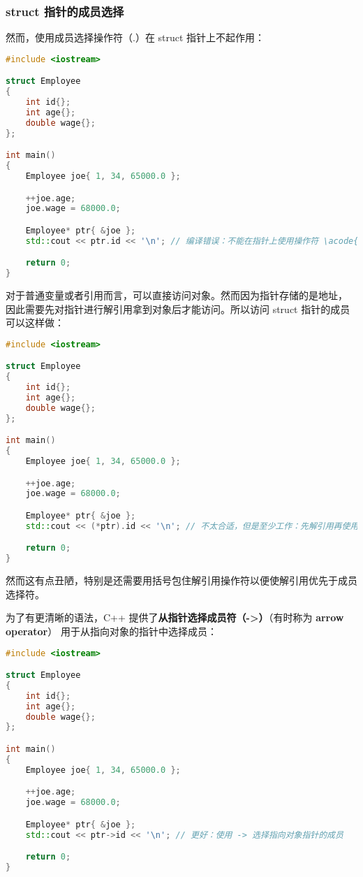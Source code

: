 \documentclass[../../LearnCpp.tex]{subfiles}
\begin{document}

\subsubsection*{struct 指针的成员选择}

然而，使用成员选择操作符（.）在 struct 指针上不起作用：

\begin{lstlisting}[language=C++]
#include <iostream>

struct Employee
{
    int id{};
    int age{};
    double wage{};
};

int main()
{
    Employee joe{ 1, 34, 65000.0 };

    ++joe.age;
    joe.wage = 68000.0;

    Employee* ptr{ &joe };
    std::cout << ptr.id << '\n'; // 编译错误：不能在指针上使用操作符 \acode{.}

    return 0;
}
\end{lstlisting}

对于普通变量或者引用而言，可以直接访问对象。然而因为指针存储的是地址，
因此需要先对指针进行解引用拿到对象后才能访问。所以访问 struct 指针的成员可以这样做：

\begin{lstlisting}[language=C++]
#include <iostream>

struct Employee
{
    int id{};
    int age{};
    double wage{};
};

int main()
{
    Employee joe{ 1, 34, 65000.0 };

    ++joe.age;
    joe.wage = 68000.0;

    Employee* ptr{ &joe };
    std::cout << (*ptr).id << '\n'; // 不太合适，但是至少工作：先解引用再使用成员选择

    return 0;
}
\end{lstlisting}

然而这有点丑陋，特别是还需要用括号包住解引用操作符以便使解引用优先于成员选择符。

为了有更清晰的语法，C++ 提供了\textbf{从指针选择成员符（->）}（有时称为 \textbf{arrow operator}）
用于从指向对象的指针中选择成员：

\begin{lstlisting}[language=C++]
#include <iostream>

struct Employee
{
    int id{};
    int age{};
    double wage{};
};

int main()
{
    Employee joe{ 1, 34, 65000.0 };

    ++joe.age;
    joe.wage = 68000.0;

    Employee* ptr{ &joe };
    std::cout << ptr->id << '\n'; // 更好：使用 -> 选择指向对象指针的成员

    return 0;
}
\end{lstlisting}
\end{document}
